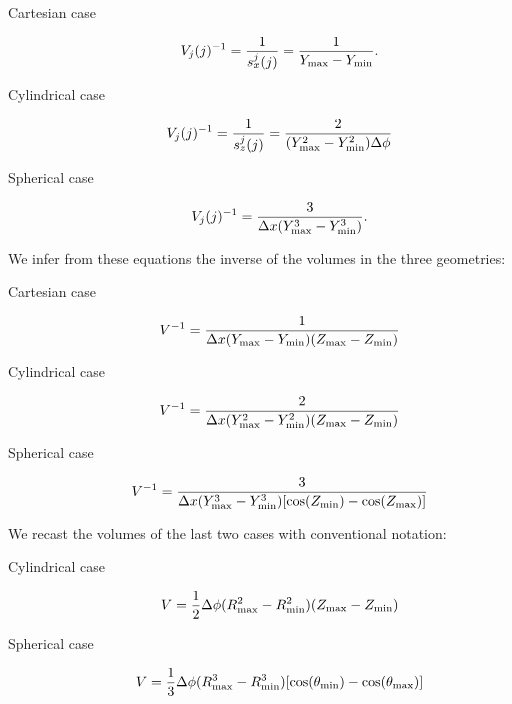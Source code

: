 \documentclass{article}
\begin{document}
\begin{description}
\item[Cartesian case] 
  \begin{equation}
    \label{eq:6}
    V_j(j)^{-1}=\frac{1}{s_x^j(j)}=\frac{1}{Y_{\rm max}-Y_{\rm min}}.
  \end{equation}
\item[Cylindrical case] 
  \begin{equation}
    \label{eq:7}
    V_j(j)^{-1}=\frac{1}{s_z^j(j)}=\frac{2}{(Y_{\rm max}^2-Y_{\rm min}^2)\Delta\phi}
  \end{equation}
\item[Spherical case] 
  \begin{equation}
    \label{eq:8}
    V_j(j)^{-1}=\frac{3}{\Delta x(Y_{\rm max}^3-Y_{\rm min}^3)}.
  \end{equation}
\end{description}
We infer from these equations the inverse of the volumes in the three geometries:
\begin{description}
\item[Cartesian case] 
  \begin{equation}
    \label{eq:9}
    V^{-1}=\frac{1}{\Delta x(Y_{\rm max}-Y_{\rm min})(Z_{\rm max}-Z_{\rm min})}
  \end{equation}
\item[Cylindrical case] 
  \begin{equation}
    \label{eq:10}
    V^{-1}=\frac{2}{\Delta x(Y_{\rm max}^2-Y_{\rm min}^2)(Z_{\rm max}-Z_{\rm min})}
  \end{equation}
\item[Spherical case] 
  \begin{equation}
    \label{eq:11}
    V^{-1}=\frac{3}{\Delta x(Y_{\rm max}^3-Y_{\rm min}^3)[\cos(Z_{\rm min})-\cos(Z_{\rm max})]}
  \end{equation}
\end{description}
We recast the volumes of the last two cases with conventional notation:
\begin{description}
\item[Cylindrical case] 
  \begin{equation}
    \label{eq:12}
    V=\frac 12\Delta \phi(R_{\rm max}^2-R_{\rm min}^2)(Z_{\rm max}-Z_{\rm min})
  \end{equation}
\item[Spherical case] 
  \begin{equation}
    \label{eq:13}
    V=\frac 13\Delta\phi(R_{\rm max}^3-R_{\rm min}^3)[\cos(\theta_{\rm min})-\cos(\theta_{\rm max})]
  \end{equation}
\end{description}
\end{document}
